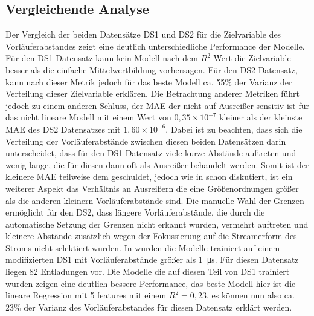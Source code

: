 \subsection{Vergleichende Analyse}
\label{sec:ds12ana}
Der Vergleich der beiden Datensätze DS1 und DS2 für die Zielvariable des Vorläuferabstandes zeigt eine deutlich unterschiedliche Performance der Modelle. Für den DS1 Datensatz kann kein Modell nach dem \(R^2\) Wert die Zielvariable besser als die einfache Mittelwertbildung vorhersagen. Für den DS2 Datensatz, kann nach dieser Metrik jedoch für das beste Modell ca. 55\% der Varianz der Verteilung dieser Zielvariable erklären. Die Betrachtung anderer Metriken führt jedoch zu einem anderen Schluss, der MAE der nicht auf Ausreißer sensitiv ist für das nicht lineare Modell mit einem Wert von \(0{,}35 \times 10^{-7}\) kleiner als der kleinste MAE des DS2 Datensatzes mit \(1{,}60 \times 10^{-6}\). Dabei ist zu beachten, dass sich die Verteilung der Vorläuferabstände zwischen diesen beiden Datensätzen darin unterscheidet, dass für den DS1 Datensatz viele kurze Abstände auftreten und wenig lange, die für diesen dann oft als Ausreißer behandelt werden. Somit ist der kleinere MAE teilweise dem geschuldet, jedoch wie in  schon diskutiert, ist ein weiterer Aspekt das Verhältnis an Ausreißern die eine Größenordnungen größer als die anderen kleinern Vorläuferabstände sind. Die manuelle Wahl der Grenzen ermöglicht für den DS2, dass längere Vorläuferabstände, die durch die automatische Setzung der Grenzen nicht erkannt wurden, vermehrt auftreten und kleinere Abstände zusätzlich wegen der Fokussierung auf die Streamerform des Stroms nicht selektiert wurden. In  wurden die Modelle trainiert auf einem modifizierten DS1 mit Vorläuferabstände größer als \SI{1}{\micro\second}. Für diesen Datensatz liegen 82 Entladungen vor. Die Modelle die auf diesen Teil von DS1 trainiert wurden zeigen eine deutlich bessere Performance, das beste Modell hier ist die lineare Regression mit 5 features mit einem \(R^2=0,23\), es können nun also ca. 23\% der Varianz des Vorläuferabstandes für diesen Datensatz erklärt werden. 
